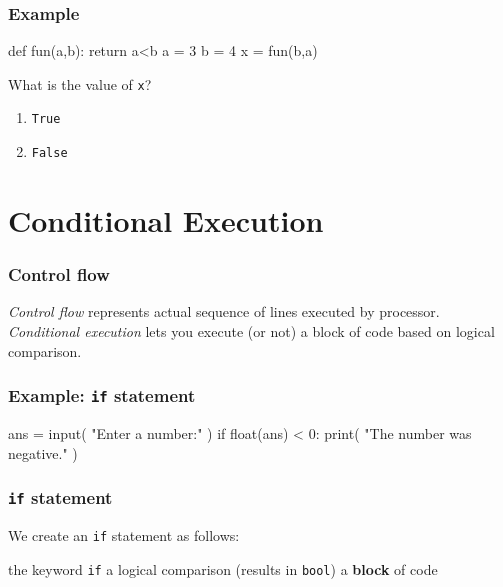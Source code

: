 \documentclass[11pt]{beamer}
\begin{document}
\begin{frame}[fragile]
  \frametitle{Example}
  \Enlarge

  \begin{semiverbatim}
def fun(a,b):
    return a<b
a = 3
b = 4
x = fun(b,a)
  \end{semiverbatim}
  What is the value of \texttt{x}?
  \begin{enumerate}[label=\Alph*]
  \item  \texttt{True}
  \item  \texttt{False}
  \end{enumerate}
\end{frame}

\section{Conditional Execution}

\begin{frame}[fragile]
  \frametitle{Control flow}
  \Enlarge

  \begin{itemize}
  \myitem  \emph{Control flow} represents actual sequence of lines executed by processor.
  \myitem  \emph{Conditional execution} lets you execute (or not) a block of code based on logical comparison.
  \end{itemize}
\end{frame}

\begin{frame}[fragile]
  \frametitle{Example:  \texttt{if} statement}
  \Enlarge

  \begin{semiverbatim}
ans = input( "Enter a number:" )
if float(ans) < 0:
    print( "The number was negative." )
  \end{semiverbatim}
\end{frame}

\begin{frame}[fragile]
  \frametitle{\texttt{if} statement}
  \Enlarge

  \begin{itemize}
  \myitem  We create an \texttt{if} statement as follows:
    \begin{itemize}
    \mysubitem  the keyword \texttt{if}
    \mysubitem  a logical comparison (results in \texttt{bool})
    \mysubitem  a \textbf{block} of code
    \end{itemize}
  \end{itemize}
\end{frame}
\end{document}
